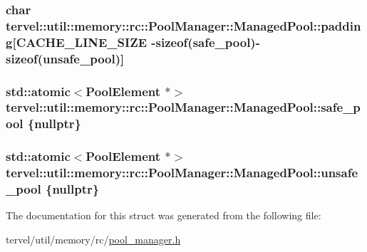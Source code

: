 \subsubsection[{padding}]{\setlength{\rightskip}{0pt plus 5cm}char tervel\+::util\+::memory\+::rc\+::\+Pool\+Manager\+::\+Managed\+Pool\+::padding\mbox{[}{\bf C\+A\+C\+H\+E\+\_\+\+L\+I\+N\+E\+\_\+\+S\+I\+Z\+E} -\/sizeof({\bf safe\+\_\+pool})-\/sizeof({\bf unsafe\+\_\+pool})\mbox{]}}\label{structtervel_1_1util_1_1memory_1_1rc_1_1_pool_manager_1_1_managed_pool_a1c5d4e16c41dc07c936d6192e4e25775}
\hypertarget{structtervel_1_1util_1_1memory_1_1rc_1_1_pool_manager_1_1_managed_pool_a629673750afb186a300d9a387c1f5bce}{}
\subsubsection[{safe\+\_\+pool}]{\setlength{\rightskip}{0pt plus 5cm}std\+::atomic$<${\bf Pool\+Element} $\ast$$>$ tervel\+::util\+::memory\+::rc\+::\+Pool\+Manager\+::\+Managed\+Pool\+::safe\+\_\+pool \{nullptr\}}\label{structtervel_1_1util_1_1memory_1_1rc_1_1_pool_manager_1_1_managed_pool_a629673750afb186a300d9a387c1f5bce}
\hypertarget{structtervel_1_1util_1_1memory_1_1rc_1_1_pool_manager_1_1_managed_pool_aca865c03268b33d1e2ae18ce8f861abe}{}
\subsubsection[{unsafe\+\_\+pool}]{\setlength{\rightskip}{0pt plus 5cm}std\+::atomic$<${\bf Pool\+Element} $\ast$$>$ tervel\+::util\+::memory\+::rc\+::\+Pool\+Manager\+::\+Managed\+Pool\+::unsafe\+\_\+pool \{nullptr\}}\label{structtervel_1_1util_1_1memory_1_1rc_1_1_pool_manager_1_1_managed_pool_aca865c03268b33d1e2ae18ce8f861abe}


The documentation for this struct was generated from the following file\+:\begin{DoxyCompactItemize}
\item 
tervel/util/memory/rc/\hyperlink{pool__manager_8h}{pool\+\_\+manager.\+h}\end{DoxyCompactItemize}
